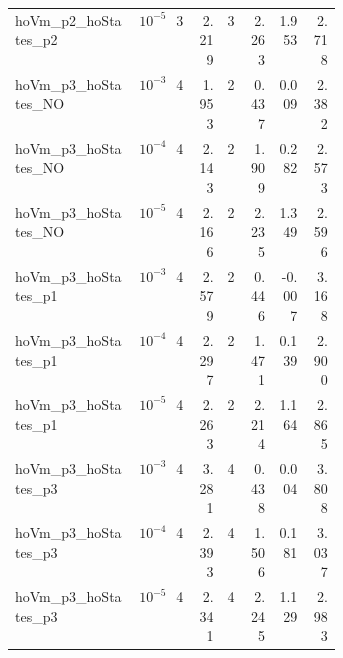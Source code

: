 \begin{longtable}{p{0.38\linewidth}lrrrrrr}
hoVm\_p2\_hoStates\_p2 & $10^{-5}$ & 3 & 2.219 & 3 & 2.263 & 1.953 & 2.718 \\
hoVm\_p3\_hoStates\_NO & $10^{-3}$ & 4 & 1.953 & 2 & 0.437 & 0.009 & 2.382 \\
hoVm\_p3\_hoStates\_NO & $10^{-4}$ & 4 & 2.143 & 2 & 1.909 & 0.282 & 2.573 \\
hoVm\_p3\_hoStates\_NO & $10^{-5}$ & 4 & 2.166 & 2 & 2.235 & 1.349 & 2.596 \\
hoVm\_p3\_hoStates\_p1 & $10^{-3}$ & 4 & 2.579 & 2 & 0.446 & -0.007 & 3.168 \\
hoVm\_p3\_hoStates\_p1 & $10^{-4}$ & 4 & 2.297 & 2 & 1.471 & 0.139 & 2.900 \\
hoVm\_p3\_hoStates\_p1 & $10^{-5}$ & 4 & 2.263 & 2 & 2.214 & 1.164 & 2.865 \\
hoVm\_p3\_hoStates\_p3 & $10^{-3}$ & 4 & 3.281 & 4 & 0.438 & 0.004 & 3.808 \\
hoVm\_p3\_hoStates\_p3 & $10^{-4}$ & 4 & 2.393 & 4 & 1.506 & 0.181 & 3.037 \\
hoVm\_p3\_hoStates\_p3 & $10^{-5}$ & 4 & 2.341 & 4 & 2.245 & 1.129 & 2.983 \\
\bottomrule
\end{longtable}
